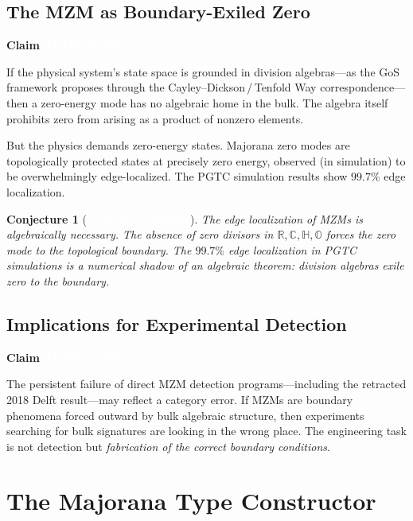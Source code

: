 \documentclass[11pt,letterpaper]{article}
\newcommand{\motivated}{\texorpdfstring{\colorbox{motivated}{\textcolor{white}{\scriptsize\textbf{\,MOTIVATED\,}}}}{ [MOTIVATED]}}
\newcommand{\conjectured}{\texorpdfstring{\colorbox{conjectured}{\textcolor{white}{\scriptsize\textbf{\,CONJECTURED\,}}}}{ [CONJECTURED]}}
\newtheorem{conjecture}[theorem]{Conjecture}
\newenvironment{claim}[1]{%
  \par\medskip\noindent\textbf{Claim} #1\quad\itshape
}{%
  \par\medskip
}
\newcommand{\R}{\mathbb{R}}
\newcommand{\C}{\mathbb{C}}
\newcommand{\HH}{\mathbb{H}}
\newcommand{\OO}{\mathbb{O}}
\begin{document}
\subsection{The MZM as Boundary-Exiled Zero}

\begin{claim}{\motivated}
If the physical system's state space is grounded in division algebras---as the GoS framework proposes through the Cayley--Dickson\,/\,Tenfold Way correspondence---then a zero-energy mode has no algebraic home in the bulk. The algebra itself prohibits zero from arising as a product of nonzero elements.
\end{claim}

But the physics demands zero-energy states. Majorana zero modes are topologically protected states at precisely zero energy, observed (in simulation) to be overwhelmingly edge-localized. The PGTC simulation results show $99.7\%$ edge localization.

\begin{conjecture}[\conjectured]\label{conj:exile}
The edge localization of MZMs is \emph{algebraically necessary}. The absence of zero divisors in $\R, \C, \HH, \OO$ \emph{forces} the zero mode to the topological boundary. The $99.7\%$ edge localization in PGTC simulations is a numerical shadow of an algebraic theorem: division algebras exile zero to the boundary.
\end{conjecture}

\subsection{Implications for Experimental Detection}

\begin{claim}{\motivated}
The persistent failure of direct MZM detection programs---including the retracted 2018 Delft result---may reflect a category error. If MZMs are boundary phenomena forced outward by bulk algebraic structure, then experiments searching for bulk signatures are looking in the wrong place. The engineering task is not detection but \emph{fabrication of the correct boundary conditions}.
\end{claim}


\section{The Majorana Type Constructor}
\end{document}
